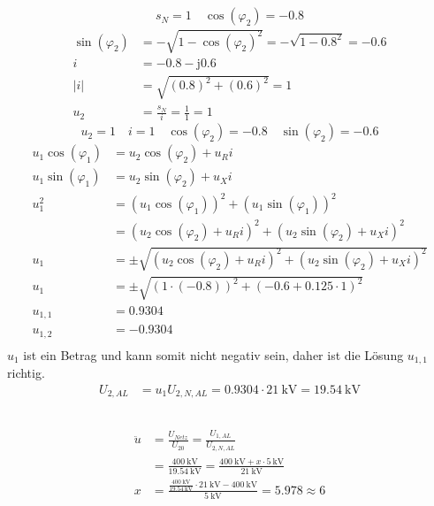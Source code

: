 \documentclass[11pt,a4paper]{scrartcl}
\newcommand{\mybr}[1]{\left(#1\right)}
\renewcommand{\j}{\mathrm{j}}
\newcommand{\0}{_{\mybr{0}}}
\newcommand{\1}{_{\mybr{1}}}
\newcommand{\2}{_{\mybr{2}}}
\newcommand{\USA}{U_{2,AL}}
\newcommand{\USNA}{U_{2,N,AL}}
\newcommand{\ce}{\cos\mybr{\varphi_1}}
\newcommand{\se}{\sin\mybr{\varphi_1}}
\newcommand{\cz}{\cos\mybr{\varphi_2}}
\newcommand{\sz}{\sin\mybr{\varphi_2}}
\begin{document}
\subsection{}
\begin{equation}
s_N=1\quad\cz=-\num{0.8}
\end{equation}
\begin{align}
\sz&=-\sqrt{1-\cz^2}=-\sqrt{1-{\num{0.8}}^2}=\num{-0.6}\\
i&=-\num{0.8}-\j\num{0.6}\\
\vert i\vert&=\sqrt{\mybr{\num{0.8}}^2+\mybr{\num{0.6}}^2}=1\\
u_2&=\frac{s_N}{i}=\frac{1}{1}=1
\end{align}
\begin{equation}
u_2=1\quad i=\num{1}\quad \cz=-\num{0.8}\quad \sz=-\num{0.6}
\end{equation}
\begin{align}
u_1\ce&=u_2\cz+u_R i\\
u_1\se&=u_2\sz+u_X i\\
u_1^2&=\mybr{u_1\ce}^2+\mybr{u_1\se}^2\\
&=\mybr{u_2\cz+u_R i}^2+\mybr{u_2\sz+u_X i}^2\\
u_1&=\pm\sqrt{\mybr{u_2\cz+u_R i}^2+\mybr{u_2\sz+u_X i}^2}\\
u_1&=\pm\sqrt{\mybr{1\cdot\mybr{\num{-0.8}}}^2+\mybr{\num{-0.6}+\num{0.125}\cdot 1}^2}\\
u_{1,1}&=\num{0.9304}\\
u_{1,2}&=\num{-0.9304}\\
\end{align}
$u_1$ ist ein Betrag und kann somit nicht negativ sein, daher ist die Lösung $u_{1,1}$ richtig.
\begin{align}
\USA&=u_1\USNA=\num{0.9304}\cdot\SI{21}{\kilo\volt}=\SI{19.54}{\kilo\volt}
\end{align}

\subsection{}
\begin{align}
\ddot{u}&=\frac{U_{Netz}}{U_{20}}=\frac{U_{1,AL}}{\USNA}\\
&=\frac{\SI{400}{\kilo\volt}}{\SI{19.54}{\kilo\volt}}=\frac{\SI{400}{\kilo\volt}+x\cdot\SI{5}{\kilo\volt}}{\SI{21}{\kilo\volt}}\\
x&=\frac{\frac{\SI{400}{\kilo\volt}}{\SI{19.54}{\kilo\volt}}\cdot\SI{21}{\kilo\volt}-\SI{400}{\kilo\volt}}{\SI{5}{\kilo\volt}}=5.978\approx 6
\end{align}
\end{document}
